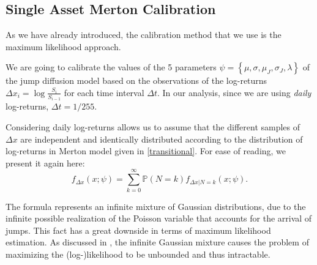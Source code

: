 \subsection{Single Asset Merton Calibration}
As we have already introduced, the calibration method that we use is the maximum likelihood approach.

We are going to calibrate the values of the 5 parameters $\psi= \left\{ \mu, \sigma, \mu_J, \sigma_J, \lambda \right\}$ of the jump diffusion model based on the observations of the log-returns $\Delta x_i = \log \frac{S_i}{S_{i-1}}$ for each time interval $\Delta t$. In our analysis, since we are using \textit{daily} log-returns, $\Delta t = 1/255$. 

Considering daily log-returns allows us to assume that the different samples of $\Delta x$ are independent and identically distributed according to the distribution of log-returns in Merton model given in \eqref{transitional}.
For ease of reading, we present it again here:
\begin{equation}
\label{eq:merton_full_pdf}
f_{\Delta x } (x; \psi) = \sum_{k=0}^{\infty} \mathbb{P}(N = k) f_{\Delta x | N = k}(x ; \psi) .
\end{equation}

The formula represents an infinite mixture of Gaussian distributions, due to the infinite possible realization of the Poisson variable that accounts for the arrival of jumps. 
This fact has a great downside in terms of maximum likelihood estimation. As discussed in \citep{HONORE1998}, the infinite Gaussian mixture causes the problem of maximizing the (log-)likelihood to be unbounded and thus intractable.


